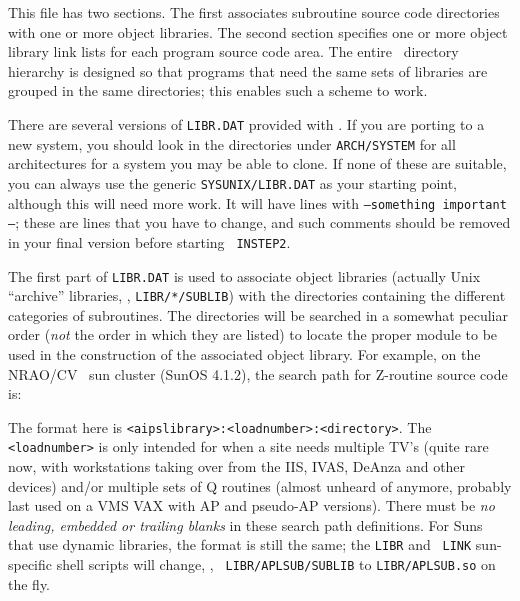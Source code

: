 
This file has two sections.  The first associates subroutine source
code directories with one or more object libraries.  The second
section specifies one or more object library link lists for each
program source code area.  The entire \AIPS\ directory hierarchy is
designed so that programs that need the same sets of libraries are
grouped in the same directories; this enables such a scheme to work.

There are several versions of {\tt LIBR.DAT} provided with \AIPS.  If
you are porting to a new system, you should look in the directories
under {\tt\dol ARCH/SYSTEM} for all architectures for a system you may be
able to clone.  If none of these are suitable, you can always use the
generic {\tt\dol SYSUNIX/LIBR.DAT} as your starting point, although this
will need more work.  It will have lines with {\tt ---something
important---}; these are lines that you have to change, and such
comments should be removed in your final version before starting {\tt
INSTEP2}.

The first part of {\tt LIBR.DAT} is used to associate object libraries
(actually Unix ``archive'' libraries, \ie, {\tt \dol LIBR/*/SUB\-LIB}) with
the directories containing the different categories of subroutines.  The
directories will be searched in a somewhat peculiar order ({\it not\/}
the order in which they are listed) to locate the proper module to be
used in the construction of the associated object library.  For example,
on the NRAO/CV \aips\ sun cluster (SunOS 4.1.2), the search path for
Z-routine source code is: \medskip

\vbox{
\example{ }
}
\medskip

\noindent
The format here is {\tt <aipslibrary>:<loadnumber>:<directory>}.  The
{\tt <loadnumber>} is only intended for when a site needs multiple TV's
(quite rare now, with workstations taking over from the IIS, IVAS,
DeAnza and other devices) and/or multiple sets of Q routines (almost
unheard of anymore, probably last used on a VMS VAX with AP and
pseudo-AP versions).  There must be {\it no leading, embedded or
trailing blanks\/} in these search path definitions.  For Suns that use
dynamic libraries, the format is still the same; the {\tt LIBR} and {\tt
LINK} sun-specific shell scripts will change, \eg, {\tt
\dol LIBR/APLSUB/SUBLIB} to {\tt \dol LIBR/APLSUB.so} on the fly.

